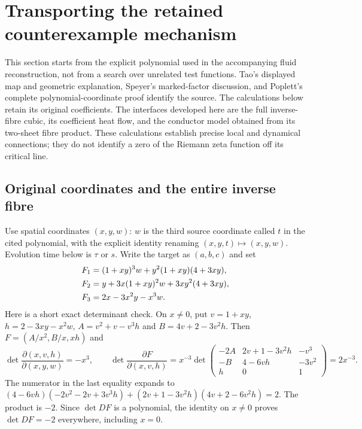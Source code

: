 \section{Transporting the retained counterexample mechanism}
\label{sec:retained-mechanism}

This section starts from the explicit polynomial used in the accompanying
fluid reconstruction, not from a search over unrelated test functions.
Tao's displayed map and geometric explanation\cite{tao2026jacobian},
Speyer's marked-factor discussion\cite{speyer2026jacobian}, and
Poplett's complete polynomial-coordinate proof\cite{poplett2026alias}
identify the source. The calculations below retain its original coefficients.
The interfaces developed here are the full inverse-fibre cubic, its coefficient
heat flow, and the conductor model obtained from its two-sheet fibre product.
These calculations establish precise local and dynamical connections;
they do not identify a zero of the Riemann zeta function off its critical line.

\subsection{Original coordinates and the entire inverse fibre}
Use spatial coordinates $(x,y,w)$: $w$ is the third source coordinate
called $t$ in the cited polynomial, with the explicit identity renaming
$(x,y,t)\mapsto(x,y,w)$. Evolution time below is $\tau$ or $s$.
Write the target as $(a,b,c)$ and set
\begin{align}
 F_1&=(1+xy)^3w+y^2(1+xy)(4+3xy),\notag\\
 F_2&=y+3x(1+xy)^2w+3xy^2(4+3xy),\notag\\
 F_3&=2x-3x^2y-x^3w. \label{eq:retained-F}
\end{align}
Here is a short exact determinant check. On $x\ne0$, put
$v=1+xy$, $h=2-3xy-x^2w$, $A=v^2+v-v^3h$ and
$B=4v+2-3v^2h$. Then $F=(A/x^2,B/x,xh)$ and
\[
 \det\frac{\partial(x,v,h)}{\partial(x,y,w)}=-x^3,
 \qquad
 \det\frac{\partial F}{\partial(x,v,h)}
 =x^{-3}\det\begin{pmatrix}
 -2A&2v+1-3v^2h&-v^3\\
 -B&4-6vh&-3v^2\\h&0&1
 \end{pmatrix}=2x^{-3}.
\]
The numerator in the last equality expands to
$(4-6vh)(-2v^2-2v+3v^3h)
+(2v+1-3v^2h)(4v+2-6v^2h)=2$.
The product is $-2$. Since $\det DF$ is a polynomial, the identity on
$x\ne0$ proves $\det DF=-2$ everywhere, including $x=0$.

